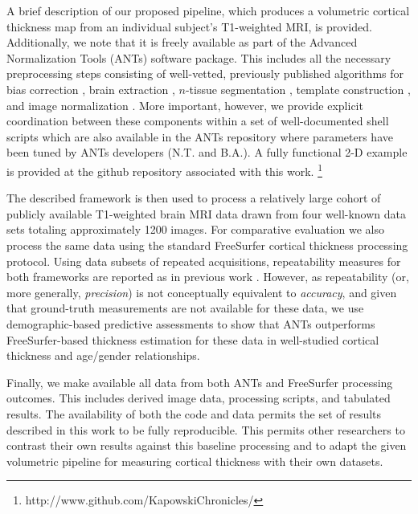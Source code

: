 A brief description of our proposed pipeline, which produces a volumetric
cortical thickness map from an individual subject's T1-weighted MRI, is provided.  
Additionally, we note that it is freely available as part of the Advanced Normalization Tools
(ANTs) software package.  This includes all the necessary preprocessing steps consisting
of well-vetted, previously published algorithms for bias correction \citep{tustison2010},
brain extraction \citep{avants2010a}, $n$-tissue segmentation \citep{avants2011a},
template construction \citep{avants2010}, and image normalization \citep{avants2011}.
More important, however, we provide explicit coordination between
these components within a set of well-documented shell scripts which 
are also available in the ANTs repository where parameters have been tuned
by ANTs developers (N.T. and B.A.).  A fully functional 2-D example is provided
at the github repository associated with this work.%
\footnote{
http://www.github.com/KapowskiChronicles/
}

The described framework is then used to process a relatively large 
cohort of publicly available T1-weighted brain MRI data drawn from 
four well-known data sets totaling approximately 1200 images.  For
comparative evaluation we also process the same data using the 
standard FreeSurfer cortical thickness processing protocol.  Using 
data subsets of repeated acquisitions, repeatability measures
for both frameworks are reported as in previous work 
\citep{clarkson2011,jovicich2013}.  However, as repeatability (or, more generally, {\it precision})
is not conceptually equivalent to {\it accuracy}, and given that ground-truth
measurements are not available for these data, we use demographic-based
predictive assessments to show that ANTs outperforms FreeSurfer-based
thickness estimation for these data in well-studied cortical thickness 
and age/gender relationships.

Finally, we make available all data from both ANTs and FreeSurfer 
processing outcomes.  This includes derived image data, processing scripts, 
and tabulated results.  The availability of both the code and data permits
the set of results described in this work to be fully reproducible.  This
permits other researchers to contrast their own results against
this baseline processing and to adapt the given volumetric pipeline for measuring
cortical thickness with their own datasets.  



